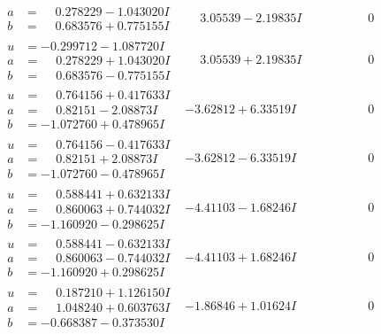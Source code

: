 \documentclass[1p]{elsarticle_modified}
\theoremstyle{definition}
\begin{document}
$$\begin{array}{c|c|c}
\begin{aligned}
a &= \phantom{-}0.278229 - 1.043020 I \\
b &= \phantom{-}0.683576 + 0.775155 I\end{aligned}
 & \phantom{-}3.05539 - 2.19835 I & \phantom{-0.000000 } 0 \\ \hline\begin{aligned}
u &= -0.299712 - 1.087720 I \\
a &= \phantom{-}0.278229 + 1.043020 I \\
b &= \phantom{-}0.683576 - 0.775155 I\end{aligned}
 & \phantom{-}3.05539 + 2.19835 I & \phantom{-0.000000 } 0 \\ \hline\begin{aligned}
u &= \phantom{-}0.764156 + 0.417633 I \\
a &= \phantom{-}0.82151 - 2.08873 I \\
b &= -1.072760 + 0.478965 I\end{aligned}
 & -3.62812 + 6.33519 I & \phantom{-0.000000 } 0 \\ \hline\begin{aligned}
u &= \phantom{-}0.764156 - 0.417633 I \\
a &= \phantom{-}0.82151 + 2.08873 I \\
b &= -1.072760 - 0.478965 I\end{aligned}
 & -3.62812 - 6.33519 I & \phantom{-0.000000 } 0 \\ \hline\begin{aligned}
u &= \phantom{-}0.588441 + 0.632133 I \\
a &= \phantom{-}0.860063 + 0.744032 I \\
b &= -1.160920 - 0.298625 I\end{aligned}
 & -4.41103 - 1.68246 I & \phantom{-0.000000 } 0 \\ \hline\begin{aligned}
u &= \phantom{-}0.588441 - 0.632133 I \\
a &= \phantom{-}0.860063 - 0.744032 I \\
b &= -1.160920 + 0.298625 I\end{aligned}
 & -4.41103 + 1.68246 I & \phantom{-0.000000 } 0 \\ \hline\begin{aligned}
u &= \phantom{-}0.187210 + 1.126150 I \\
a &= \phantom{-}1.048240 + 0.603763 I \\
b &= -0.668387 - 0.373530 I\end{aligned}
 & -1.86846 + 1.01624 I & \phantom{-0.000000 } 0 \\ \hline\begin{aligned}

\end{aligned}
\end{array}$$
\end{document}
